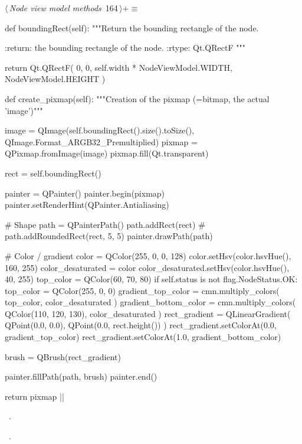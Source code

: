 \documentclass[%
    a4paper,    %
    justified,  %
    nobib,      %
    openany     %
]{tufte-book}
\begin{document}
\begin{flushleft} \small
\begin{minipage}{\linewidth}\label{scrap191}\raggedright\small
{} $\langle\,${\itshape Node view model methods}\nobreak\ {\footnotesize {164}}$\,\rangle+\equiv$
\vspace{-1ex}
\begin{pythoncode}
def boundingRect(self):
    """Return the bounding rectangle of the node.

    :return: the bounding rectangle of the node.
    :rtype: Qt.QRectF
    """

    return Qt.QRectF(
        0, 0, self.width * NodeViewModel.WIDTH, NodeViewModel.HEIGHT
    )

def create_pixmap(self):
    """Creation of the pixmap (=bitmap, the actual 'image')"""

    image = QImage(self.boundingRect().size().toSize(),
                    QImage.Format_ARGB32_Premultiplied)
    pixmap = QPixmap.fromImage(image)
    pixmap.fill(Qt.transparent)

    rect = self.boundingRect()

    painter = QPainter()
    painter.begin(pixmap)
    painter.setRenderHint(QPainter.Antialiasing)

    # Shape
    path = QPainterPath()
    path.addRect(rect)
    # path.addRoundedRect(rect, 5, 5)
    painter.drawPath(path)

    # Color / gradient
    color = QColor(255, 0, 0, 128)
    color.setHsv(color.hsvHue(), 160, 255)
    color_desaturated = color
    color_desaturated.setHsv(color.hsvHue(), 40, 255)
    top_color = QColor(60, 70, 80)
    if self.status is not flag.NodeStatus.OK:
        top_color = QColor(255, 0, 0)
    gradient_top_color = cmn.multiply_colors(
        top_color, color_desaturated
    )
    gradient_bottom_color = cmn.multiply_colors(
        QColor(110, 120, 130), color_desaturated
    )
    rect_gradient = QLinearGradient(
        QPoint(0.0, 0.0), QPoint(0.0, rect.height())
    )
    rect_gradient.setColorAt(0.0, gradient_top_color)
    rect_gradient.setColorAt(1.0, gradient_bottom_color)

    brush = QBrush(rect_gradient)

    painter.fillPath(path, brush)
    painter.end()

    return pixmap
|\NWsep|
\end{pythoncode}
\vspace{1.5ex}
\footnotesize
\begin{list}{}{\setlength{\itemsep}{-\parsep}\setlength{\itemindent}{-\leftmargin}}
\item \NWtxtMacroDefBy\ .
\item \NWtxtMacroRefIn\ .

\item{}
\end{list}
\end{minipage}\vspace{4ex}
\end{flushleft}
\end{document}

